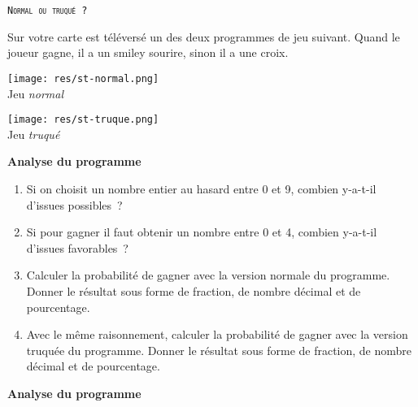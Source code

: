 \begin{eleve}    
    \texttt{\textsc{Normal ou truqué ?}}
    
    Sur votre carte est téléversé un des deux programmes de jeu suivant. Quand le joueur gagne, il a un smiley sourire, sinon il a  une croix. 
    
    
    
\begin{minipage}[t]{0.5\linewidth}
    \begin{center}
        \vspace{0cm}
        \texttt{[image: res/st-normal.png]}\\
        Jeu \emph{normal}
    \end{center}
\end{minipage}
\hfill
\begin{minipage}[t]{0.5\linewidth}
    \begin{center}
        \vspace{0cm}
        \texttt{[image: res/st-truque.png]}\\
        Jeu \emph{truqué}
    \end{center}
\end{minipage}
    
    \textbf{Analyse du programme}
    
    \begin{enumerate}
        \item   Si on choisit un nombre entier au hasard entre 0 et 9, combien y-a-t-il d’issues possibles ?
        \item Si pour gagner il faut obtenir un nombre entre 0 et 4, combien y-a-t-il d’issues favorables ?  
        \item Calculer la probabilité de gagner avec la version normale du programme. Donner le résultat sous forme de fraction, de nombre décimal et de pourcentage.
        \item Avec le même raisonnement, calculer la probabilité de gagner avec la version truquée du programme. Donner le résultat sous forme de fraction, de nombre décimal et de pourcentage.
    \end{enumerate}
    
    \newpage
    \textbf{Analyse du programme}
    

\end{eleve}
